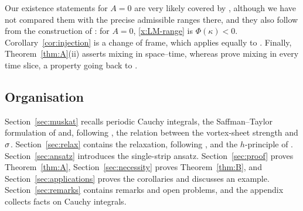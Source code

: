 Our existence statements for $A=0$ are very likely covered by \cite{FS18,CFM22}, although we have not compared them with the precise admissible ranges there, and they also follow from the construction of
\cite{LM26}: for $A=0$, \eqref{x:LM-range} is $\Phi(\kappa)<0$. Corollary~\ref{cor:injection} is a change of frame, which applies equally to \cite[Thm.~1.1]{LM26}. Finally, Theorem~\ref{thm:A}(ii) asserts
mixing in space--time, whereas \cite{LM26} prove mixing in every time slice, a property going back to \cite{CFM19}.

\subsection*{Organisation}
Section~\ref{sec:muskat} recalls periodic Cauchy integrals, the Saffman--Taylor formulation of \cite{LM26} and, following \cite[Sec.~3.1.3]{LM26}, the relation between the vortex-sheet strength and $\sigma$.
Section~\ref{sec:relax} contains the relaxation, following \cite{Men22}, and the $h$-principle of \cite{Men22}. Section~\ref{sec:ansatz} introduces the single-strip ansatz. Section~\ref{sec:proof} proves
Theorem~\ref{thm:A}, Section~\ref{sec:necessity} proves Theorem~\ref{thm:B}, and Section~\ref{sec:applications} proves the corollaries and discusses an example. Section~\ref{sec:remarks} contains remarks and
open problems, and the appendix collects facts on Cauchy integrals.

